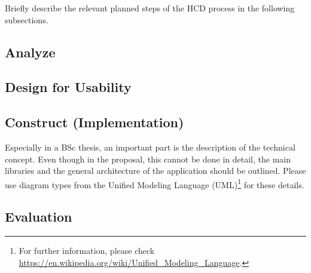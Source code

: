 Briefly describe the relevant planned steps of the HCD process in the following subsections.

\subsection{Analyze}
\label{subsec:analyze}

\subsection{Design for Usability}
\label{subsec:design}

\subsection{Construct (Implementation)}
\label{subsec:implementation}

Especially in a BSc thesis, an important part is the description of the technical concept. Even though in the proposal, this cannot be done in detail, the main libraries and the general architecture of the application should be outlined. Please use diagram types from the Unified Modeling Language (UML)\footnote{For further information, please check \url{https://en.wikipedia.org/wiki/Unified_Modeling_Language}.} for these details.

\subsection{Evaluation}
\label{subsec:evaluation}